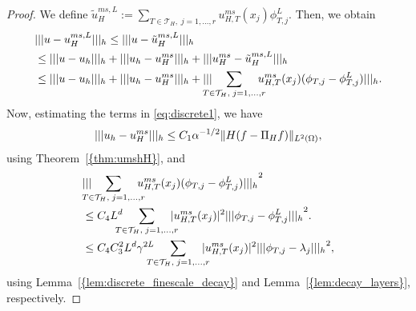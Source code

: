 \documentclass[10pt]{article}
\numberwithin{equation}{section}
\theoremstyle{plain}
\theoremstyle{definition}
\theoremstyle{remark}
\begin{document}
\begin{proof} We define $\tilde{u}^{ms,L}_{H}:=\sum_{T\in{\mathcal{T}}_H,\;j=1,\ldots,r}{u^{ms}_{H,T}}(x_j)\phi^L_{T,j}$. Then, we obtain
  \begin{equation}\label{eq:discrete1}
    \begin{aligned}
      &{||| {u-{u^{ms,L}_{H}}} |||_h} \leq {||| {u-\tilde{u}^{ms,L}_{H}} |||_h} \\
      & \leq {||| {u-u_h} |||_h}+{||| {u_h-{u^{ms}_{H}}} |||_h}+{||| {{u^{ms}_{H}}-\tilde{u}^{ms,L}_{H}} |||_h} \\
       & \leq {||| {u-u_h} |||_h}+{||| {u_h-{u^{ms}_{H}}} |||_h}+{||| {\hspace{-2ex}\sum_{T\in{\mathcal{T}}_H,\;j=1,\ldots,r}\hspace{-2ex}{u^{ms}_{H,T}}(x_j)(\phi_{T,j}-\phi^L_{T,j})} |||_h}.
    \end{aligned}
  \end{equation}   
  Now, estimating the terms in \eqref{eq:discrete1}, we have 
  \begin{equation}\notag
    {||| {u_h-{u^{ms}_{H}}} |||_h} \leq C_1{\alpha}^{-1/2}\|H(f-{\Pi_H} f)\|_{L^2(\Omega)},
  \end{equation}
  using {Theorem~\ref{{thm:umshH}}}, and
  \begin{equation}
    \begin{aligned}\label{eq:discrete2}
      &{||| {\hspace{-2ex}\sum_{T\in{\mathcal{T}}_H,\;j=1,\ldots,r}\hspace{-2ex} {u^{ms}_{H,T}}(x_j)(\phi_{T,j} - \phi^L_{T,j})} |||_h}^2 \\ 
      &\leq  C_4L^d\hspace{-2ex}\sum_{T\in{\mathcal{T}}_H,\;j=1,\ldots,r}\hspace{-2ex}|{u^{ms}_{H,T}}(x_j)|^2{||| {\phi_{T,j}-\phi^L_{T,j}} |||_h}^2. \\
      & \leq C_4C_3^2L^d\gamma^{2L}\hspace{-2ex}\sum_{T\in{\mathcal{T}}_H,\;j=1,\ldots,r}\hspace{-2ex}|{u^{ms}_{H,T}}(x_j)|^2{||| {\phi_{T,j}-\lambda_{j}} |||_h}^2,
    \end{aligned}
  \end{equation}
  using {Lemma~\ref{{lem:discrete_finescale_decay}}} and {Lemma~\ref{{lem:decay_layers}}}, respectively.
  
  
  
  
  
  
  

\end{proof}
\end{document}
